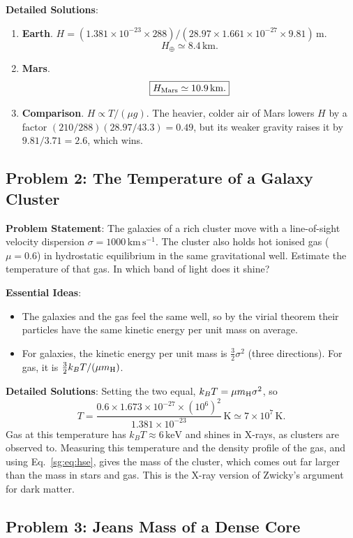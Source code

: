\textbf{Detailed Solutions}:
\begin{enumerate}[label=(\alph*)]
	\item \textbf{Earth}. $H=(1.381\times10^{-23}\times288)/(28.97\times1.661\times10^{-27}\times9.81)\,\mathrm m$.
	\[
	\boxed{H_\oplus\simeq8.4\,\mathrm{km}.}
	\]
	\item \textbf{Mars}.
	\[
	\boxed{H_{\rm Mars}\simeq10.9\,\mathrm{km}.}
	\]
	\item \textbf{Comparison}. $H\propto T/(\mu g)$. The heavier, colder air of Mars lowers $H$ by a factor $(210/288)(28.97/43.3)=0.49$, but its weaker gravity raises it by $9.81/3.71=2.6$, which wins.
\end{enumerate}

\subsection{Problem 2: The Temperature of a Galaxy Cluster}
\label{sg:prob:cluster}

\textbf{Problem Statement}: The galaxies of a rich cluster move with a line-of-sight velocity dispersion $\sigma=1000\,\mathrm{km\,s^{-1}}$. The cluster also holds hot ionised gas ($\mu=0.6$) in hydrostatic equilibrium in the same gravitational well. Estimate the temperature of that gas. In which band of light does it shine?

\textbf{Essential Ideas}:
\begin{itemize}
	\item The galaxies and the gas feel the same well, so by the virial theorem their particles have the same kinetic energy per unit mass on average.
	\item For galaxies, the kinetic energy per unit mass is $\tfrac32\sigma^2$ (three directions). For gas, it is $\tfrac32k_BT/(\mu m_{\rm H})$.
\end{itemize}

\textbf{Detailed Solutions}:
Setting the two equal, $k_BT=\mu m_{\rm H}\sigma^2$, so
\[
\boxed{T=\frac{0.6\times1.673\times10^{-27}\times(10^6)^2}{1.381\times10^{-23}}\,\mathrm K\simeq7\times10^7\,\mathrm K.}
\]
Gas at this temperature has $k_BT\approx6\,\mathrm{keV}$ and shines in X-rays, as clusters are observed to. Measuring this temperature and the density profile of the gas, and using Eq.~\eqref{sg:eq:hse}, gives the mass of the cluster, which comes out far larger than the mass in stars and gas. This is the X-ray version of Zwicky's argument for dark matter.

\subsection{Problem 3: Jeans Mass of a Dense Core}
\label{sg:prob:jeans}

